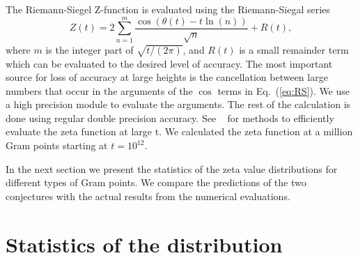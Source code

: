 \documentclass[twoside]{article}
\begin{document}
The Riemann-Siegel Z-function is evaluated using the Riemann-Siegal series
\begin{equation}
Z(t) = 2\sum^{m}_{n=1}\frac{\cos(\theta(t) - t \ln (n))}{\sqrt{n}} + R(t), 
\label{eq:RS}
\end{equation}
where $m$ is the integer part of $\sqrt{t/(2\pi)}$, and $R(t)$ is a small remainder
term which can be evaluated to the desired level of accuracy. The most important 
source for loss of accuracy at large heights is the cancellation between
large numbers that occur in the arguments of the $\cos$ terms in Eq.~(\ref{eq:RS}). We 
use a high precision module to evaluate the arguments. The rest of the calculation
is done using regular double precision accuracy. See ~\cite{hiary,gourdon,Odlyzko(1989)} for methods to efficiently evaluate the zeta function at large t.
We calculated the zeta function at a million Gram points starting at $t = 10^{12}$.

In the next section we present the statistics of the zeta value distributions for different types of Gram points. We compare the predictions of the two conjectures with the actual results from the numerical evaluations.

\section{\label{sec4}Statistics of the distribution}
\end{document}
